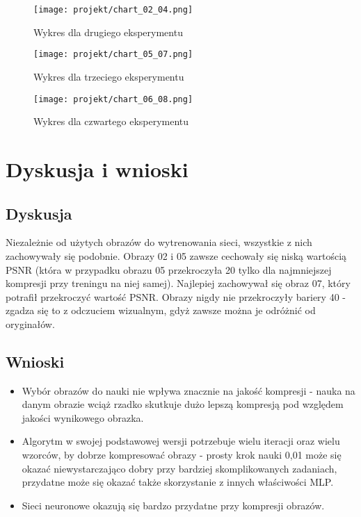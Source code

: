 \documentclass[12pt]{article}
\begin{document}
\begin{figure}[H]
 \centering
 \texttt{[image: projekt/chart\_02\_04.png]}
 \caption{Wykres dla drugiego eksperymentu}
 \label{chart_02}
\end{figure}

\begin{figure}[H]
 \centering
 \texttt{[image: projekt/chart\_05\_07.png]}
 \caption{Wykres dla trzeciego eksperymentu}
 \label{chart_03}
\end{figure}

\begin{figure}[H]
 \centering
 \texttt{[image: projekt/chart\_06\_08.png]}
 \caption{Wykres dla czwartego eksperymentu}
 \label{chart_04}
\end{figure}




\newpage
\section{Dyskusja i wnioski}

\subsection{Dyskusja}

Niezależnie od użytych obrazów do wytrenowania sieci, wszystkie z nich zachowywały się podobnie. Obrazy 02 i 05 zawsze cechowały się niską wartością PSNR (która w przypadku obrazu 05 przekroczyła 20 tylko dla najmniejszej kompresji przy treningu na niej samej). Najlepiej zachowywał się obraz 07, który potrafił przekroczyć wartość PSNR. Obrazy nigdy nie przekroczyły bariery 40 - zgadza się to z odczuciem wizualnym, gdyż zawsze można je odróżnić od oryginałów.

\subsection{Wnioski}

\begin{itemize}
    \item Wybór obrazów do nauki nie wpływa znacznie na jakość kompresji - nauka na danym obrazie wciąż rzadko skutkuje dużo lepszą kompresją pod względem jakości wynikowego obrazka.
    \item Algorytm w swojej podstawowej wersji potrzebuje wielu iteracji oraz wielu wzorców, by dobrze kompresować obrazy - prosty krok nauki 0,01 może się okazać niewystarczająco dobry przy bardziej skomplikowanych zadaniach, przydatne może się okazać także skorzystanie z innych właściwości MLP.
    \item Sieci neuronowe okazują się bardzo przydatne przy kompresji obrazów.
\end{itemize}



\newpage
\renewcommand\refname{Bibliografia}


\end{document}
